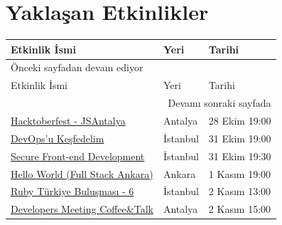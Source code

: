 \documentclass[11pt]{article}
\begin{document}
\section{Yaklaşan Etkinlikler}
\label{sec:orgd56f2f8}
\begin{longtable}{|p{8cm}|l|l|}
\hline
Etkinlik İsmi & Yeri & Tarihi\\
\hline
\endfirsthead
\multicolumn{3}{l}{Önceki sayfadan devam ediyor} \\
\hline

Etkinlik İsmi & Yeri & Tarihi \\

\hline
\endhead
\hline\multicolumn{3}{r}{Devamı sonraki sayfada} \\
\endfoot
\endlastfoot
\hline
\href{https://kommunity.com/jsantalya/events/hacktoberfest-jsantalya}{Hacktoberfest - JSAntalya} & Antalya & 28 Ekim 19:00\\
\href{https://www.eventbrite.com/e/devopsu-kesfedelim-tickets-77855011435}{DevOps'u Keşfedelim} & İstanbul & 31 Ekim 19:00\\
\href{https://kommunity.com/frontend-istanbul/events/secure-front-end-development}{Secure Front-end Development} & İstanbul & 31 Ekim 19:30\\
\href{https://kommunity.com/fsankara/events/hello-world-cyberpark}{Hello World (Full Stack Ankara)} & Ankara & 1 Kasım 19:00\\
\href{https://kommunity.com/ruby-turkiye/events/ruby-turkiye-bulusmasi-6}{Ruby Türkiye Buluşması - 6} & İstanbul & 2 Kasım 13:00\\
\href{https://kommunity.com/manavgat-developers-group-mdg/events/developers-meeting-coffeetalk}{Developers Meeting Coffee\&Talk} & Antalya & 2 Kasım 15:00\\
\hline
\end{longtable}
\end{document}
